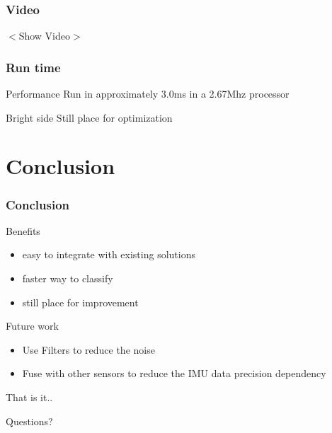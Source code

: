 \documentclass{beamer}
\begin{document}
	\begin{frame}
		\frametitle{Video}
		\centering
		$<$Show Video$>$
		
	\end{frame}		

	\begin{frame}
		\frametitle{Run time}

		\begin{alertblock}{Performance}
			Run in approximately 3.0ms in a 2.67Mhz processor
		\end{alertblock}		
		
		\begin{exampleblock}{Bright side}
			Still place for optimization
		\end{exampleblock}				
		
	\end{frame}	

\section{Conclusion}

	\begin{frame}
		\frametitle{Conclusion}
		
		\begin{block}{Benefits}
			\begin{itemize}
			\item easy to integrate with existing solutions
			\item faster way to classify
			\item still place for improvement
			\end{itemize}
		\end{block}		
		
		\begin{block}{Future work}
			\begin{itemize}
			\item Use Filters to reduce the noise
			\item Fuse with other sensors to reduce the IMU data precision dependency
			\end{itemize}
		\end{block}
		
	\end{frame}

	\begin{frame}{That is it..}
	\begin{alertblock}{}
		\centering
		Questions?
	\end{alertblock}
	\end{frame} 	
 	
{} 	
\end{document}
